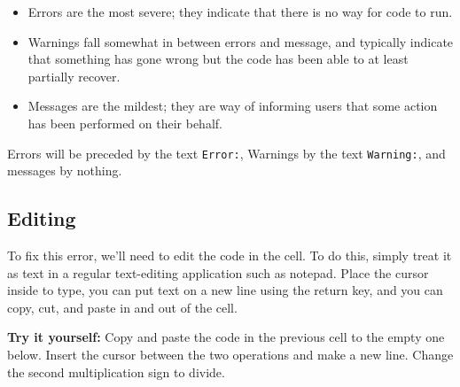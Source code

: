 \documentclass[
  letterpaper,
  DIV=11,
  numbers=noendperiod]{scrreprt}
\newenvironment{Shaded}{\begin{snugshade}}{\end{snugshade}}
\begin{document}
\begin{itemize}
\item
  Errors are the most severe; they indicate that there is no way for
  code to run.
\item
  Warnings fall somewhat in between errors and message, and typically
  indicate that something has gone wrong but the code has been able to
  at least partially recover.
\item
  Messages are the mildest; they are way of informing users that some
  action has been performed on their behalf.
\end{itemize}

Errors will be preceded by the text \texttt{Error:}, Warnings by the
text \texttt{Warning:}, and messages by nothing.

\subsection{Editing}\label{editing}

To fix this error, we'll need to edit the code in the cell. To do this,
simply treat it as text in a regular text-editing application such as
notepad. Place the cursor inside to type, you can put text on a new line
using the return key, and you can copy, cut, and paste in and out of the
cell.

\textbf{Try it yourself:} Copy and paste the code in the previous cell
to the empty one below. Insert the cursor between the two operations and
make a new line. Change the second multiplication sign to divide.

\begin{Shaded}
\begin{Highlighting}[]



\end{Highlighting}
\end{Shaded}
\end{document}
